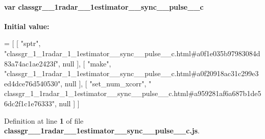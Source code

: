 \paragraph[{classgr\+\_\+1\+\_\+1radar\+\_\+1\+\_\+1estimator\+\_\+\+\_\+sync\+\_\+\+\_\+pulse\+\_\+\+\_\+c}]{\setlength{\rightskip}{0pt plus 5cm}var classgr\+\_\+\_\+1radar\+\_\+\_\+1estimator\+\_\+\+\_\+sync\+\_\+\+\_\+pulse\+\_\+\+\_\+c}\label{classgr__1__1radar__1__1estimator____sync____pulse____c_8js_a3a7c4d01da8927eb13c72c62cd2388e7}
{\bfseries Initial value\+:}
\begin{DoxyCode}
=
[
    [ \textcolor{stringliteral}{"sptr"}, \textcolor{stringliteral}{"classgr\_1\_1radar\_1\_1estimator\_\_sync\_\_pulse\_\_c.html#a0f1e035b97983084d83a74ac1ae2423f"}, null 
      ],
    [ \textcolor{stringliteral}{"make"}, \textcolor{stringliteral}{"classgr\_1\_1radar\_1\_1estimator\_\_sync\_\_pulse\_\_c.html#a0f20918ac31c299e3ed4dce76d540530"}, null 
      ],
    [ \textcolor{stringliteral}{"set\_num\_xcorr"}, \textcolor{stringliteral}{"
      classgr\_1\_1radar\_1\_1estimator\_\_sync\_\_pulse\_\_c.html#a959281af6a687b1de56dc2f1c1e76333"}, null ]
]
\end{DoxyCode}


Definition at line {\bf 1} of file {\bf classgr\+\_\+\_\+1radar\+\_\+\_\+1estimator\+\_\+\+\_\+sync\+\_\+\+\_\+pulse\+\_\+\+\_\+c.\+js}.

